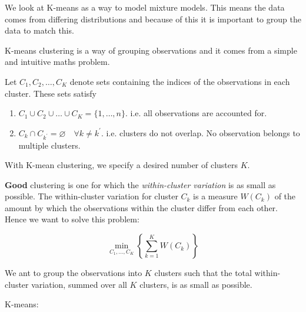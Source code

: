 \documentclass[11pt]{article}
\begin{document}
We look at K-means as a way to model mixture models. This means the data comes from differing distributions and because of this it is important to group the data to match this.

K-means clustering is a way of grouping observations and it comes from a simple and intuitive maths problem.

\begin{definition}
    Let $C_1, C_2, \ldots, C_K$ denote sets containing the indices of the observations in each cluster. These sets satisfy

    \begin{enumerate}
        \item $C_1 \cup C_2 \cup \ldots \cup C_K = \{1, \ldots, n\}$. i.e. all observations are accounted for.

        \item $C_k \cap C_{k^\prime} = \varnothing \quad \forall k \neq k^\prime$. i.e. clusters do not overlap. No observation belongs to multiple clusters.
    \end{enumerate}
\end{definition}

\begin{note}
    With K-mean clustering, we specify a desired number of clusters $K$. 
\end{note}

\textbf{Good} clustering is one for which the \textit{within-cluster variation} is as small as possible. The within-cluster variation for cluster $C_k$ is a measure $W(C_k)$ of the amount by which the observations within the cluster differ from each other. Hence we want to solve this problem:

\begin{equation*}
    \underset{C_1, \ldots, C_K}{\min}\left\{\sum_{k=1}^K W(C_k)\right\}
\end{equation*}

We ant to group the observations into $K$ clusters such that the total within-cluster variation, summed over all $K$ clusters, is as small as possible. %

\begin{algo}
    K-means:

    \begin{center}
\end{center}
\end{algo}
\end{document}
